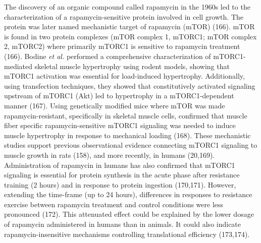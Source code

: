 \documentclass[twoside,10pt]{gihclass} %
\begin{document}
The discovery of an organic compound called rapamycin in the 1960s led to the characterization of a rapamycin-sensitive protein involved in cell growth. The protein was later named mechanistic target of rapamycin (mTOR)
(166).
mTOR is found in two protein complexes (mTOR complex 1, mTORC1; mTOR complex 2, mTORC2) where primarily mTORC1 is sensitive to rapamycin treatment
(166).
Bodine \emph{et al.} performed a comprehensive characterization of mTORC1-mediated skeletal muscle hypertrophy using rodent models, showing that mTORC1 activation was essential for load-induced hypertrophy. Additionally, using transfection techniques, they showed that constitutively activated signaling upstream of mTORC1 (Akt) led to hypertrophy in a mTORC1-dependent manner
(167).
Using genetically modified mice where mTOR was made rapamycin-resistant, specifically in skeletal muscle cells, confirmed that muscle fiber specific rapamycin-sensitive mTORC1 signaling was needed to induce muscle hypertrophy in response to mechanical loading
(168).
These mechanistic studies support previous observational evidence connecting mTORC1 signaling to muscle growth in rats
(158),
and more recently, in humans
(20,169).
Administration of rapamycin in humans has also confirmed that mTORC1 signaling is essential for protein synthesis in the acute phase after resistance training (2 hours) and in response to protein ingestion
(170,171).
However, extending the time-frame (up to 24 hours), differences in responses to resistance exercise between rapamycin treatment and control conditions were less pronounced
(172).
This attenuated effect could be explained by the lower dosage of rapamycin administered in humans than in animals.
It could also indicate rapamycin-insensitive mechanisms controlling translational efficiency
(173,174).
\end{document}
